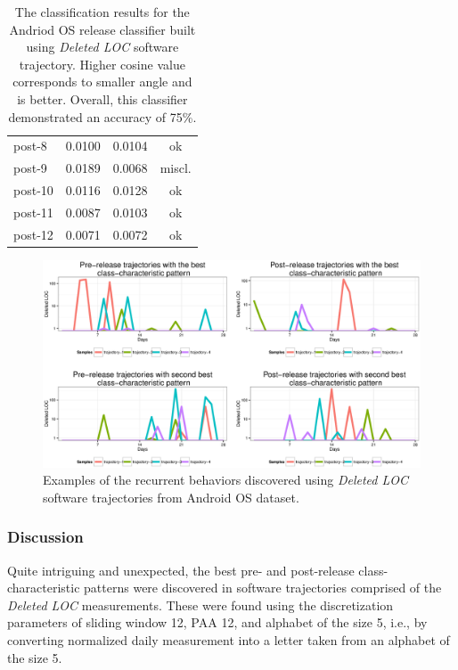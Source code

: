 {\begin{table}[t!]
{{\begin{minipage}[b]{0.47\hsize}
\begin{tabular}{l c c c}
post-8 & 0.0100 & 0.0104 & ok\\
post-9 & 0.0189 & 0.0068 & miscl.\\
post-10& 0.0116& 0.0128& ok\\
post-11& 0.0087 & 0.0103&  ok\\
post-12& 0.0071 & 0.0072&  ok\\
\bottomrule
\end{tabular}
\end{minipage}%
\caption[Classification results for the Andriod OS release classifier built using the \textit{Deleted LOC} software trajectory.]{The classification results for the Andriod OS release classifier built using \textit{Deleted LOC} software trajectory. Higher cosine value corresponds to smaller angle and is better. Overall, this classifier demonstrated an accuracy of 75\%.}
\label{android_table3}
}}
\end{table}
\begin{figure}[h!]
   \centering
   \includegraphics[width=150mm]{figures/omap_deleted_lines_patterns_plot.eps}
   \caption[Examples of the recurrent behaviors discovered using \textit{Deleted LOC} software trajectories from Android OS dataset.]{Examples of the recurrent behaviors discovered using \textit{Deleted LOC} software trajectories from Android OS dataset.}
   \label{fig:OMAP_patterns}
\end{figure}
} %

\subsubsection{Discussion}
Quite intriguing and unexpected, the best pre- and post-release class-characteristic patterns were discovered in software trajectories comprised of the \textit{Deleted LOC} measurements. These were found using the discretization parameters of sliding window 12, PAA 12, and alphabet of the size 5, i.e., by converting normalized daily measurement into a letter taken from an alphabet of the size 5. 

